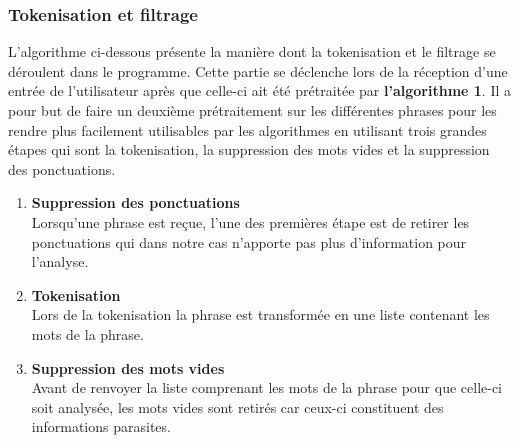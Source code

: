 \documentclass{rapport}
\begin{document}
\subsubsection{Tokenisation et filtrage}
L'algorithme ci-dessous présente la manière dont la tokenisation et le filtrage se déroulent dans le programme. Cette partie se déclenche lors de la réception d'une entrée de l'utilisateur après que celle-ci ait été prétraitée par \textbf{l'algorithme 1}. Il a pour but de faire un deuxième prétraitement sur les différentes phrases pour les rendre plus facilement utilisables par les algorithmes en utilisant trois grandes étapes qui sont la tokenisation, la suppression des mots vides et la suppression des ponctuations.
\begin{enumerate}
    \item \textbf{Suppression des ponctuations}\\
    Lorsqu'une phrase est reçue, l'une des premières étape est de retirer les ponctuations qui dans notre cas n'apporte pas plus d'information pour l'analyse.
    \item \textbf{Tokenisation}\\
    Lors de la tokenisation la phrase est transformée en une liste contenant les mots de la phrase.
    \item \textbf{Suppression des mots vides}\\
    Avant de renvoyer la liste comprenant les mots de la phrase pour que celle-ci soit analysée, les mots vides sont retirés car ceux-ci constituent des informations parasites.
\end{enumerate}
\end{document}
